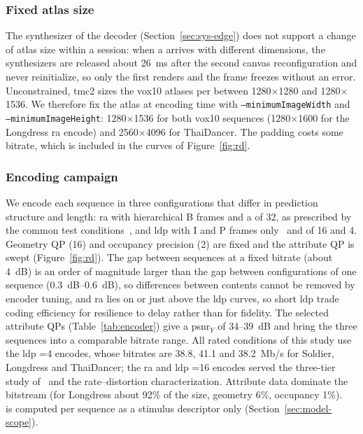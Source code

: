 \subsubsection{Fixed atlas size}
The synthesizer of the decoder (Section~\ref{sec:sys-edge}) does not
support a change of atlas size within a session: when a \gof arrives
with different dimensions, the synthesizers are released about
\SI{26}{\milli\second} after the second canvas reconfiguration and never
reinitialize, so only the first \gof renders and the frame freezes
without an error. Unconstrained, \gls{tmc2} sizes the vox10 atlases per
\gof between 1280$\times$1280 and 1280$\times$1536. We therefore fix the
atlas at encoding time with \texttt{--minimumImageWidth} and
\texttt{--minimumImageHeight}: 1280$\times$1536 for both vox10
sequences (1280$\times$1600 for the Longdress \gls{ra} encode) and
2560$\times$4096 for ThaiDancer. The padding costs some bitrate, which
is included in the curves of Figure~\ref{fig:rd}.

\subsubsection{Encoding campaign}
We encode each sequence in three configurations that differ in
prediction structure and \gof length: \gls{ra} with hierarchical B
frames and a \gof of 32, as prescribed by the \vpcc common test
conditions~\cite{vpccctc}, and \gls{ldp} with I and P frames
only~\cite{hmctc} and \gofs of 16 and 4. Geometry QP (16) and occupancy
precision (2) are fixed and the attribute QP is swept
(Figure~\ref{fig:rd}). The gap between sequences at a fixed bitrate
(about \SI{4}{dB}) is an order of magnitude larger than the gap between
configurations of one sequence (\SIrange{0.3}{0.6}{dB}), so differences
between contents cannot be removed by encoder tuning, and \gls{ra} lies
on or just above the \gls{ldp} curves, so short \gls{ldp} \gofs trade
coding efficiency for resilience to delay rather than for fidelity. The
selected attribute QPs (Table~\ref{tab:encoder}) give a
\gls{psnr}$_Y$ of 34--\SI{39}{dB} and bring the three sequences into a
comparable bitrate range. All rated conditions of this study use the
\gls{ldp} \gof{}=4 encodes, whose bitrates are 38.8, 41.1 and
\SI{38.2}{Mb/s} for Soldier, Longdress and ThaiDancer; the \gls{ra} and
\gls{ldp} \gof{}=16 encodes served the three-tier study
of~\cite{mosaic2026} and the rate--distortion characterization. Attribute data dominate the bitstream (for Longdress about
92\% of the size, geometry 6\%, occupancy 1\%). \pcqm~\cite{pcqm} is
computed per sequence as a stimulus descriptor only
(Section~\ref{sec:model-scope}).

